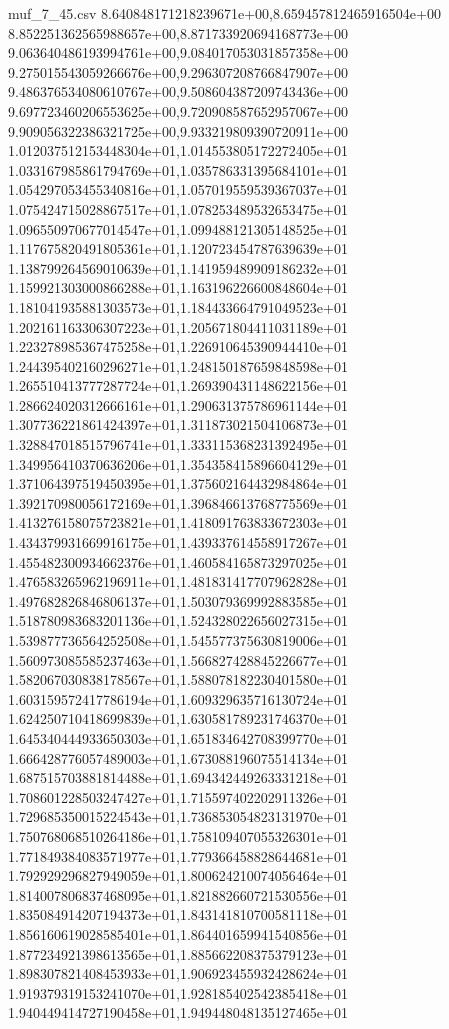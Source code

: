 \begin{filecontents*}{muf_7_45.csv}
8.640848171218239671e+00,8.659457812465916504e+00
8.852251362565988657e+00,8.871733920694168773e+00
9.063640486193994761e+00,9.084017053031857358e+00
9.275015543059266676e+00,9.296307208766847907e+00
9.486376534080610767e+00,9.508604387209743436e+00
9.697723460206553625e+00,9.720908587652957067e+00
9.909056322386321725e+00,9.933219809390720911e+00
1.012037512153448304e+01,1.014553805172272405e+01
1.033167985861794769e+01,1.035786331395684101e+01
1.054297053455340816e+01,1.057019559539367037e+01
1.075424715028867517e+01,1.078253489532653475e+01
1.096550970677014547e+01,1.099488121305148525e+01
1.117675820491805361e+01,1.120723454787639639e+01
1.138799264569010639e+01,1.141959489909186232e+01
1.159921303000866288e+01,1.163196226600848604e+01
1.181041935881303573e+01,1.184433664791049523e+01
1.202161163306307223e+01,1.205671804411031189e+01
1.223278985367475258e+01,1.226910645390944410e+01
1.244395402160296271e+01,1.248150187659848598e+01
1.265510413777287724e+01,1.269390431148622156e+01
1.286624020312666161e+01,1.290631375786961144e+01
1.307736221861424397e+01,1.311873021504106873e+01
1.328847018515796741e+01,1.333115368231392495e+01
1.349956410370636206e+01,1.354358415896604129e+01
1.371064397519450395e+01,1.375602164432984864e+01
1.392170980056172169e+01,1.396846613768775569e+01
1.413276158075723821e+01,1.418091763833672303e+01
1.434379931669916175e+01,1.439337614558917267e+01
1.455482300934662376e+01,1.460584165873297025e+01
1.476583265962196911e+01,1.481831417707962828e+01
1.497682826846806137e+01,1.503079369992883585e+01
1.518780983683201136e+01,1.524328022656027315e+01
1.539877736564252508e+01,1.545577375630819006e+01
1.560973085585237463e+01,1.566827428845226677e+01
1.582067030838178567e+01,1.588078182230401580e+01
1.603159572417786194e+01,1.609329635716130724e+01
1.624250710418699839e+01,1.630581789231746370e+01
1.645340444933650303e+01,1.651834642708399770e+01
1.666428776057489003e+01,1.673088196075514134e+01
1.687515703881814488e+01,1.694342449263331218e+01
1.708601228503247427e+01,1.715597402202911326e+01
1.729685350015224543e+01,1.736853054823131970e+01
1.750768068510264186e+01,1.758109407055326301e+01
1.771849384083571977e+01,1.779366458828644681e+01
1.792929296827949059e+01,1.800624210074056464e+01
1.814007806837468095e+01,1.821882660721530556e+01
1.835084914207194373e+01,1.843141810700581118e+01
1.856160619028585401e+01,1.864401659941540856e+01
1.877234921398613565e+01,1.885662208375379123e+01
1.898307821408453933e+01,1.906923455932428624e+01
1.919379319153241070e+01,1.928185402542385418e+01
1.940449414727190458e+01,1.949448048135127465e+01

\end{filecontents*}
